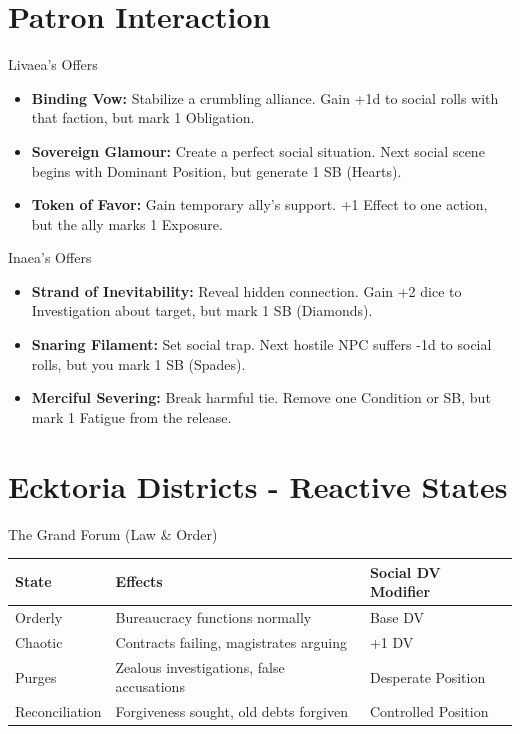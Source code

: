 \documentclass[11pt]{article}
\begin{document}
\section*{Patron Interaction}

\begin{mechanicsbox}{Livaea's Offers}
\begin{itemize}
    \item \textbf{Binding Vow:} Stabilize a crumbling alliance. Gain +1d to social rolls with that faction, but mark 1 Obligation.
    \item \textbf{Sovereign Glamour:} Create a perfect social situation. Next social scene begins with Dominant Position, but generate 1 SB (Hearts).
    \item \textbf{Token of Favor:} Gain temporary ally's support. +1 Effect to one action, but the ally marks 1 Exposure.
\end{itemize}
\end{mechanicsbox}

\begin{mechanicsbox}{Inaea's Offers}
\begin{itemize}
    \item \textbf{Strand of Inevitability:} Reveal hidden connection. Gain +2 dice to Investigation about target, but mark 1 SB (Diamonds).
    \item \textbf{Snaring Filament:} Set social trap. Next hostile NPC suffers -1d to social rolls, but you mark 1 SB (Spades).
    \item \textbf{Merciful Severing:} Break harmful tie. Remove one Condition or SB, but mark 1 Fatigue from the release.
\end{itemize}
\end{mechanicsbox}

\section*{Ecktoria Districts - Reactive States}

\begin{mechanicsbox}{The Grand Forum (Law \& Order)}
\begin{longtable}{p{}p{}p{}}
    \textbf{State} & \textbf{Effects} & \textbf{Social DV Modifier} \\
    \hline
    Orderly & Bureaucracy functions normally & Base DV \\
    Chaotic & Contracts failing, magistrates arguing & +1 DV \\
    Purges & Zealous investigations, false accusations & Desperate Position \\
    Reconciliation & Forgiveness sought, old debts forgiven & Controlled Position \\
\end{longtable}
\end{mechanicsbox}
\end{document}

